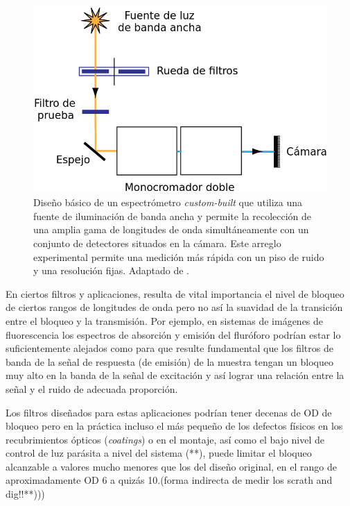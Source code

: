 \documentclass{ctuthesis}
\begin{document}
\begin{figure}[H]
	\centering
	\includegraphics[scale=0.8]{Figs/plan_de_tesis/med_mets_prevs.png}
	\caption{Diseño básico de un espectrómetro \textit{custom-built} que 
	utiliza una fuente de iluminación de banda ancha y permite la recolección 
	de una 		amplia gama de
		longitudes de onda simultáneamente con un conjunto de detectores 
		situados en la cámara. Este 
		arreglo experimental permite una medición más rápida con un piso de 
		ruido y una resolución fijas. Adaptado de 
		\cite{Semrock}.}
	\label{fig:med_prev}
\end{figure}








\hspace{0.5cm}En ciertos filtros y aplicaciones, resulta de vital importancia 
el 
nivel de bloqueo de ciertos rangos de longitudes de onda pero no así la 
suavidad de la transición entre el bloqueo y la transmisión. Por ejemplo, en 
sistemas de 
imágenes de fluorescencia los espectros de absorción y emisión del fluróforo 
podrían estar lo suficientemente alejados como para que resulte fundamental que 
los filtros de banda de la señal de respuesta (de emisión) de la muestra tengan 
un bloqueo muy alto en la banda de la señal de excitación y así lograr una 
relación entre la señal y el ruido de adecuada proporción. 

Los filtros 
diseñados para estas aplicaciones podrían tener decenas de OD de bloqueo pero 
en 
la práctica incluso el más pequeño de los defectos físicos en los 
recubrimientos ópticos (\textit{coatings}) o en el montaje, así como el bajo 
nivel de control de luz parásita a nivel del sistema (**), puede limitar el 
bloqueo alcanzable a valores mucho menores que los del diseño original, en el 
rango de aproximadamente OD 6 a quizás 10.(forma indirecta de medir los scrath 
and dig!!**))) 
\end{document}
